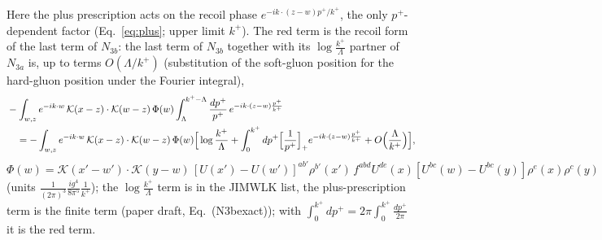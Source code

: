 Here the plus prescription acts on the recoil phase $e^{-ik\cdot(z-w)p^{+}/k^{+}}$, the only $p^{+}$-dependent factor (Eq.~\eqref{eq:plus}; upper limit $k^{+}$). The red term is the recoil form of the last term of $N_{3b}$: the last term of $N_{3b}$ together with its $\log\frac{k^{+}}{\Lambda}$ partner of $N_{3a}$ is, up to terms $O(\Lambda/k^{+})$ (substitution of the soft-gluon position for the hard-gluon position under the Fourier integral),
\begin{align}
&-\int_{w,z}e^{-ik\cdot w}\,\mathcal{K}(x-z)\cdot\mathcal{K}(w-z)\,\Phi(w)\int_{\Lambda}^{k^{+}-\Lambda}\frac{dp^{+}}{p^{+}}\,e^{-ik\cdot(z-w)\frac{p^{+}}{k^{+}}}\notag\\
&\quad=-\int_{w,z}e^{-ik\cdot w}\,\mathcal{K}(x-z)\cdot\mathcal{K}(w-z)\,\Phi(w)\Big[\log\frac{k^{+}}{\Lambda}+\int_{0}^{k^{+}}dp^{+}\Big[\frac{1}{p^{+}}\Big]_{+}e^{-ik\cdot(z-w)\frac{p^{+}}{k^{+}}}+O\Big(\frac{\Lambda}{k^{+}}\Big)\Big],\notag
\end{align}
$\Phi(w)=\mathcal{K}(x'-w')\cdot\mathcal{K}(y-w)\,[U(x')-U(w')]^{ab'}\rho^{b'}(x')\,f^{abd}U^{de}(x)[U^{bc}(w)-U^{bc}(y)]\rho^{e}(x)\rho^{c}(y)$ (units $\frac{1}{(2\pi)^{3}}\frac{ig^{4}}{8\pi^{5}}\frac{1}{k^{+}}$); the $\log\frac{k^{+}}{\Lambda}$ term is in the JIMWLK list, the plus-prescription term is the finite term (paper draft, Eq.~(N3bexact)); with $\int_{0}^{k^{+}}dp^{+}=2\pi\int_{0}^{k^{+}}\frac{dp^{+}}{2\pi}$ it is the red term.

